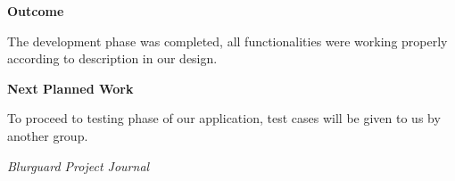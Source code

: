 \documentclass[12pt,a4paper]{article}
\begin{document}

\textbf{\large Outcome}

\vspace{4pt}

The development phase was completed, all functionalities were working properly according to description in our design.

\vspace{8pt}


\textbf{\large Next Planned Work}

\vspace{4pt}

To proceed to testing phase of our application, test cases will be given to us by another group.

\vfill


\begin{flushright}
    \textit{Blurguard Project Journal}
\end{flushright}
\end{document}
